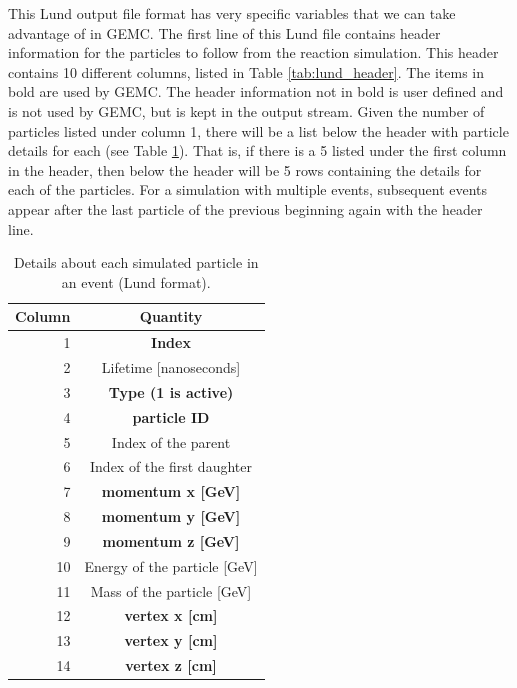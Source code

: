 This Lund output file format has very specific variables that we can take advantage of in GEMC. The first line of this Lund file contains header information for the particles to follow from the reaction simulation. This header contains 10 different columns, listed in Table \ref{tab:lund_header}. The items in bold are used by GEMC. The header information not in bold is user defined and is not used by GEMC, but is kept in the output stream. Given the number of particles listed under column 1, there will be a list below the header with particle details for each (see Table \ref{tab:lund_particles}). That is, if there is a 5 listed under the first column in the header, then below the header will be 5 rows containing the details for each of the particles. For a simulation with multiple events, subsequent events appear after the last particle of the previous beginning again with the header line.

\begin{table}[h!]
	\begin{center}
		\caption{Details about each simulated particle in an event (Lund format).}
		\label{tab:lund_particles}
		\begin{tabular}{r|c} %
			\rowcolor{cyan} \textbf{Column} & \textbf{Quantity} \\
			\hline
			1 & \textbf{Index} \\
			\rowcolor{lightgray} 2 & Lifetime [nanoseconds] \\
			3 & \textbf{Type (1 is active)} \\
			\rowcolor{lightgray} 4 & \textbf{particle ID} \\
			5 & Index of the parent \\
			\rowcolor{lightgray} 6 & Index of the first daughter \\
			7 & \textbf{momentum x [GeV]} \\
			\rowcolor{lightgray} 8 & \textbf{momentum y [GeV]} \\
			9 & \textbf{momentum z [GeV]} \\
			\rowcolor{lightgray} 10 & Energy of the particle [GeV] \\
			11 & Mass of the particle [GeV] \\
			\rowcolor{lightgray} 12 & \textbf{vertex x [cm]} \\
			13 & \textbf{vertex y [cm]} \\
			\rowcolor{lightgray} 14 & \textbf{vertex z [cm]} \\
			\hline
		\end{tabular}
	\end{center}
\end{table}


